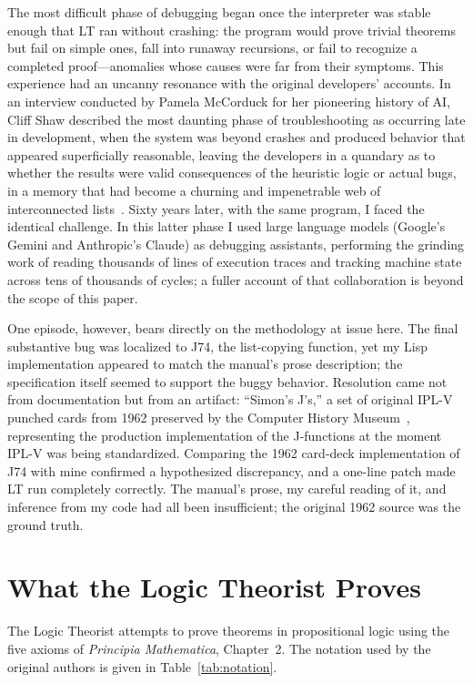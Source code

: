 \documentclass[journal]{IEEEtran}
\begin{document}
The most difficult phase of debugging began once the interpreter was
stable enough that LT ran without crashing: the program would prove
trivial theorems but fail on simple ones, fall into runaway
recursions, or fail to recognize a completed proof---anomalies whose
causes were far from their symptoms. This experience had an uncanny
resonance with the original developers' accounts. In an interview
conducted by Pamela McCorduck for her pioneering history of AI, Cliff
Shaw described the most daunting phase of troubleshooting as occurring
late in development, when the system was beyond crashes and produced
behavior that appeared superficially reasonable, leaving the
developers in a quandary as to whether the results were valid
consequences of the heuristic logic or actual bugs, in a memory that
had become a churning and impenetrable web of interconnected
lists~\cite{cmuarchiveshawinterview}. Sixty years later, with the same
program, I faced the identical challenge. In this latter phase I used
large language models (Google's Gemini and Anthropic's Claude) as
debugging assistants, performing the grinding work of reading
thousands of lines of execution traces and tracking machine state
across tens of thousands of cycles; a fuller account of that
collaboration is beyond the scope of this paper.

One episode, however, bears directly on the methodology at issue
here. The final substantive bug was localized to J74, the list-copying
function, yet my Lisp implementation appeared to match the manual's
prose description; the specification itself seemed to support the
buggy behavior. Resolution came not from documentation but from an
artifact: ``Simon's J's,'' a set of original IPL-V punched cards from
1962 preserved by the Computer History
Museum~\cite{bochannek2012simonsjs}, representing the production
implementation of the J-functions at the moment IPL-V was being
standardized. Comparing the 1962 card-deck implementation of J74 with
mine confirmed a hypothesized discrepancy, and a one-line patch made
LT run completely correctly. The manual's prose, my careful reading of
it, and inference from my code had all been insufficient; the original
1962 source was the ground truth.

\section{What the Logic Theorist Proves}
\label{sec:results}

The Logic Theorist attempts to prove theorems in propositional logic
using the five axioms of \textit{Principia Mathematica}, Chapter~2.
The notation used by the original authors is given in
Table~\ref{tab:notation}.
\end{document}
